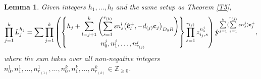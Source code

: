\documentclass[10pt,a4paper]{amsart}
\numberwithin{equation}{section}
\newtheorem{Lemma}[Theorem]{Lemma}
\begin{document}
\begin{Lemma}\label{L4}
 Given integers $h_1,\dots,h_l$ and the same setup as Theorem {\rm\ref{T5}},
\begin{align*} \prod\limits_{j=1}^{k}L_j^{h_j}=\sum\prod\limits_{j=1}^{k}
\left(\begin{matrix}
 \begin{Bmatrix}\displaystyle h_j+\sum\limits_{l=j+1}^{k}\left(\sum\limits_{s=1}^{r_{(k)}}sn_{s}^{l}\bigl(\mathbf{\hat{c}}_{l}^+,-d_{(j)} \mathbf{c}_{j}\bigr)_{D_0R}\right)\vspace{1mm}\\n_0^j,n_{1}^j,\dots,n_{r_{(j)}}^j\end{Bmatrix}
\end{matrix}\prod\limits_{s=1}^{r_{(j)}}z_{i_j,s}^{n_s^j}\right)
 \hat{\mathbf{y}}^{\sum\limits_{j=1}^{k}(\sum\limits_{s=1}^{r_{(j)}}sn_s^j)\mathbf{c}_{j}^+},
 \end{align*}
 where the sum takes over all non-negative integers $n_0^1,n_{1}^{1},\dots,n_{r_{(1)}}^1,\dots,n_0^{k},n_{1}^{k},\dots,n_{r_{(k)}}^k\in\mathbb{Z}_{\ge0}$.

\end{Lemma}
\end{document}
